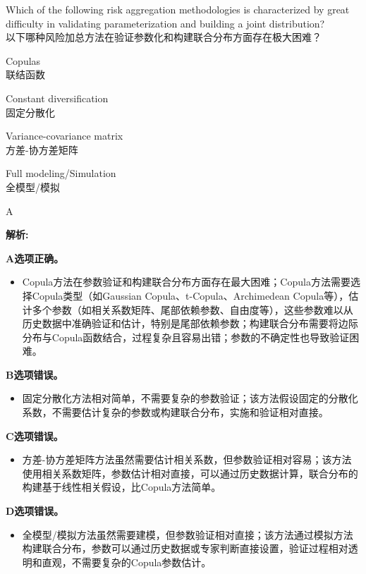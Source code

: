 \documentclass{article}
\newcounter{question} %
\newenvironment{explanation}
{\textbf{解析:}\par}
{\par}
\begin{document}
\begin{question}
    Which of the following risk aggregation methodologies is characterized by great difficulty in validating parameterization and building a joint distribution?
    \\以下哪种风险加总方法在验证参数化和构建联合分布方面存在极大困难？
\end{question}

\begin{choices}
    \item Copulas\\
    联结函数
    \item Constant diversification\\
    固定分散化
    \item Variance-covariance matrix\\
    方差-协方差矩阵
    \item Full modeling/Simulation\\
    全模型/模拟
\end{choices}

\begin{correctanswer}
    A
\end{correctanswer}

\begin{explanation}
    \textbf{A选项正确。}
    \begin{itemize}
        \item Copula方法在参数验证和构建联合分布方面存在最大困难；Copula方法需要选择Copula类型（如Gaussian Copula、t-Copula、Archimedean Copula等），估计多个参数（如相关系数矩阵、尾部依赖参数、自由度等），这些参数难以从历史数据中准确验证和估计，特别是尾部依赖参数；构建联合分布需要将边际分布与Copula函数结合，过程复杂且容易出错；参数的不确定性也导致验证困难。
    \end{itemize}

    \textbf{B选项错误。}
    \begin{itemize}
        \item 固定分散化方法相对简单，不需要复杂的参数验证；该方法假设固定的分散化系数，不需要估计复杂的参数或构建联合分布，实施和验证相对直接。
    \end{itemize}

    \textbf{C选项错误。}
    \begin{itemize}
        \item 方差-协方差矩阵方法虽然需要估计相关系数，但参数验证相对容易；该方法使用相关系数矩阵，参数估计相对直接，可以通过历史数据计算，联合分布的构建基于线性相关假设，比Copula方法简单。
    \end{itemize}

    \textbf{D选项错误。}
    \begin{itemize}
        \item 全模型/模拟方法虽然需要建模，但参数验证相对直接；该方法通过模拟方法构建联合分布，参数可以通过历史数据或专家判断直接设置，验证过程相对透明和直观，不需要复杂的Copula参数估计。
    \end{itemize}
\end{explanation}
\end{document}
